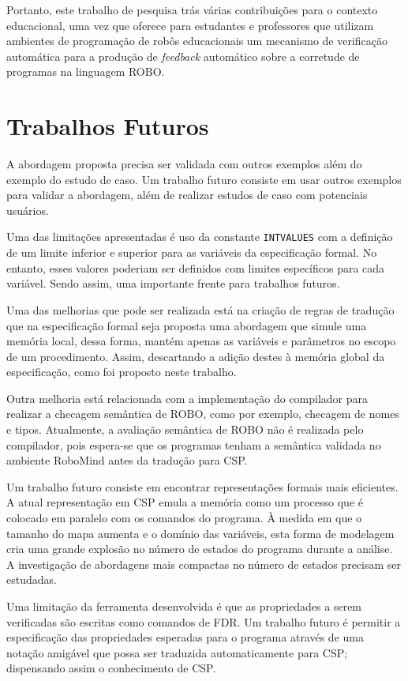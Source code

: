 Portanto, este trabalho de pesquisa trás várias contribuições para o contexto educacional, uma vez que oferece para estudantes e professores que utilizam ambientes de programação de robôs educacionais um mecanismo de verificação automática para a produção de \textit{feedback} automático sobre a corretude de programas na linguagem ROBO. 


\section{Trabalhos Futuros}

A abordagem proposta precisa ser validada com outros exemplos além do exemplo do estudo de caso. Um trabalho futuro consiste em usar outros exemplos para validar a abordagem, além de realizar estudos de caso com potenciais usuários.

Uma das limitações apresentadas é uso da constante \texttt{INTVALUES} com a definição de um limite inferior e superior para as variáveis da especificação formal. No entanto, esses valores poderiam ser definidos com limites específicos para cada variável. Sendo assim, uma importante frente para trabalhos futuros.

Uma das melhorias que pode ser realizada está na criação de regras de tradução que na especificação formal seja proposta uma abordagem que simule uma memória local, dessa forma, mantém apenas as variáveis e parâmetros no escopo de um procedimento. Assim, descartando a adição destes à memória global da especificação, como foi proposto neste trabalho.

Outra melhoria está relacionada com a implementação do compilador para realizar a checagem semântica de ROBO, como por exemplo, checagem de nomes e tipos. Atualmente, a avaliação semântica de ROBO não é realizada pelo compilador, pois espera-se que os programas tenham a semântica validada no ambiente RoboMind antes da tradução para CSP.

Um trabalho futuro consiste em encontrar representações formais mais eficientes. A atual representação em CSP emula a memória como um processo que é colocado em paralelo com os comandos do programa. À medida em que o tamanho do mapa aumenta e o domínio das variáveis, esta forma de modelagem cria uma grande explosão no número de estados do programa durante a análise. A investigação de abordagens mais compactas no número de estados precisam ser estudadas.

Uma limitação da ferramenta desenvolvida é que as propriedades a serem verificadas são escritas como comandos de FDR. Um trabalho futuro é permitir a especificação das propriedades esperadas para o programa através de uma notação amigável que possa ser traduzida automaticamente para CSP; dispensando assim o conhecimento de CSP.
